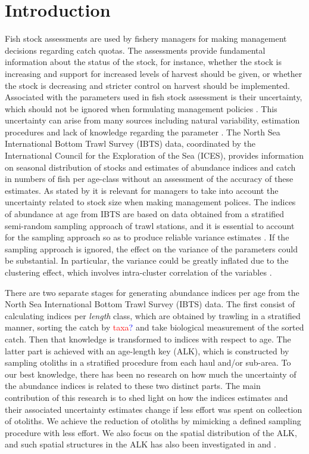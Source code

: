 \documentclass[a4paper 12pt]{article}
\numberwithin{equation}{section}
\newcommand{\ed}[1]{\textcolor{red}{#1}}
\newcommand{\nat}[1]{\textcolor{blue}{#1}}
\begin{document}
\section{Introduction}
Fish stock assessments are used by fishery managers for making management decisions regarding catch quotas. The assessments provide fundamental information about the status of the stock, for instance, whether the stock is increasing and support for increased levels of harvest should be given, or whether the stock is decreasing and stricter control on harvest should be implemented. Associated with the parameters used in fish stock assessment is their uncertainty, which should not be ignored when formulating management policies \citep{walters1981effects, ludwig1981measurement, berg2014evaluation}. This uncertainty can arise from many sources including natural variability, estimation procedures and lack of knowledge regarding the parameter \citep{ehrhardt1997role}. The North Sea International Bottom Trawl Survey (IBTS) data, coordinated by the International Council for the Exploration of the Sea (ICES), provides information on seasonal distribution of stocks and estimates of abundance indices and catch in numbers of fish per age-class without an assessment of the accuracy of these estimates. As stated by \citet{ludwig1981measurement} it is relevant for managers to take into account the uncertainty related to stock size when making management polices. The indices of abundance at age from IBTS  are based on data obtained from a stratified semi-random sampling approach of trawl stations,  and  it is essential to account for the sampling approach so as to produce reliable variance estimates \citep{lehtonen2004practical}. If the sampling approach is ignored, the effect on the variance  of the parameters could be substantial.  In particular, the variance could be greatly inflated  due to the clustering effect, which involves intra-cluster correlation of the variables \citep{aanes2015efficient, lehtonen2004practical}. 

There are two separate stages for generating abundance indices per age from the North Sea International Bottom Trawl Survey (IBTS) data.  The first consist of calculating indices per \textit{length} class, which are obtained by trawling in a stratified manner, sorting the catch by \ed{taxa}\nat{?} and take biological measurement of the sorted catch. Then that knowledge is transformed to indices with respect to age. The latter part is achieved with an age-length key (ALK), which is constructed by sampling otoliths in a stratified procedure from each haul and/or sub-area. To our best knowledge, there has been no research on how much the uncertainty of the abundance indices is related to these two distinct parts. The main contribution of this research is to shed light on how the indices estimates and their associated uncertainty estimates change if less effort was spent on collection of otoliths. We achieve the reduction of otoliths by mimicking a defined sampling procedure with less effort. We also focus on the spatial distribution of the ALK, and such spatial structures in the ALK has also been investigated in \citet{berg2012spatial} and  \citet{hirst2012bayesian}.
\end{document}
